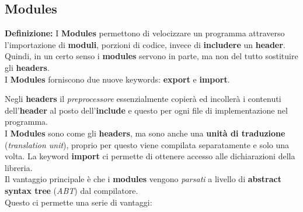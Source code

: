 \newpage

\subsection{Modules}

\textsf{\small \textbf{Definizione: } I \textbf{Modules} permettono di velocizzare un programma attraverso l'importazione di \textbf{moduli}, porzioni di codice, invece di \textbf{includere} un \textbf{header}.} \\

\textsf{\small Quindi, in un certo senso i \textbf{modules} servono in parte, ma non del tutto sostituire gli \textbf{headers}.} \\

\textsf{\small I \textbf{Modules} forniscono due nuove keywords: \textbf{export} e \textbf{import}.} \break

\textsf{\small Negli \textbf{headers} il \emph{preprocessore} essenzialmente copierà ed incollerà i contenuti dell'\textbf{header} al posto dell'\textbf{include} e questo per ogni file di implementazione nel programma.} \\

\textsf{\small I \textbf{Modules} sono come gli \textbf{headers}, ma sono anche una \textbf{unità di traduzione} (\emph{translation unit}), proprio per questo viene compilata separatamente e solo una volta. La keyword \textbf{import} ci permette di ottenere accesso alle dichiarazioni della libreria. } \\

\textsf{\small Il vantaggio principale è che i \textbf{modules} vengono \emph{parsati} a livello di \textbf{abstract syntax tree} (\emph{ABT}) dal compilatore.} \\

\textsf{\small Questo ci permette una serie di vantaggi: } \\

